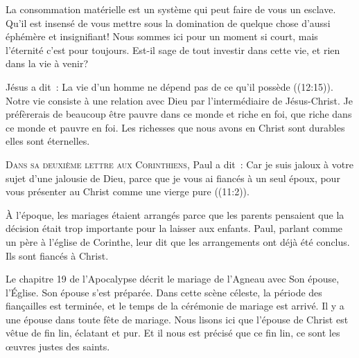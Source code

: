 
La consommation matérielle est un système qui peut faire de vous un esclave.
 Qu'il est insensé de vous mettre sous la domination de quelque chose
 d'aussi éphémère et insignifiant!
 Nous sommes ici pour un moment si court, mais l'éternité c'est pour toujours.
 Est-il sage de tout investir dans cette vie, et rien dans la vie à venir?

Jésus a dit~: 
 \og La vie d'un homme ne dépend pas de ce qu'il possède \fg{}
 ((12:15)).
 Notre vie consiste à une relation avec Dieu par l'intermédiaire
 de Jésus-Christ. Je préfèrerais de beaucoup être pauvre dans ce monde
 et riche en foi, que riche dans ce monde et pauvre en foi.
 Les richesses que nous avons en Christ sont durables
 \ocadr elles sont éternelles.

\dvrule






\lettrine{D}{ans sa deuxième lettre aux Corinthiens,}
 Paul a dit~: 
 \og Car je suis jaloux à votre sujet d'une jalousie de Dieu,
 parce que je vous ai fiancés à un seul époux,
 pour vous présenter au Christ comme une vierge pure \fg{}
 ((11:2)). 

À l'époque, les mariages étaient arrangés parce que les parents
 pensaient que la décision était trop importante pour la laisser aux enfants.
 Paul, parlant comme un père à l'église de Corinthe,
 leur dit que les arrangements ont déjà été conclus.
 Ils sont fiancés à Christ. 

Le chapitre 19 de l'Apocalypse décrit le mariage de l'Agneau avec Son épouse,
 l'Église. 
 \og Son épouse s'est préparée. \fg{} 
 Dans cette scène céleste, la période des fiançailles est terminée,
 et le temps de la cérémonie de mariage est arrivé.
 Il y a une épouse dans toute fête de mariage.
 Nous lisons ici que l'épouse de Christ est \og vêtue de fin lin,
 éclatant et pur. \fg{} 
 Et il nous est précisé que ce fin lin, ce sont
 \og les œuvres justes des saints. \fg{}  

